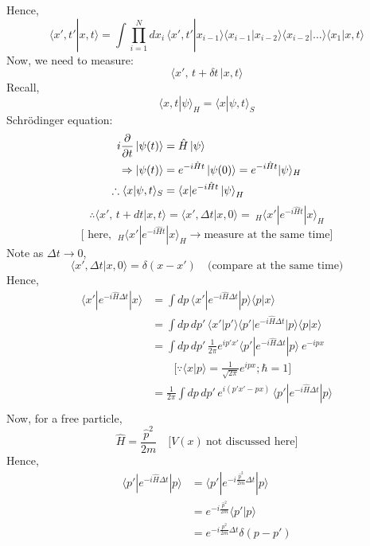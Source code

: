 \documentclass[14pt]{article} %
\begin{document}
\noindent
Hence,
\[
\langle x', t' | x, t \rangle = \int \prod_{i=1}^N dx_i \, \langle x', t' | x_{i-1} \rangle \langle x_{i-1}| x_{i-2} \rangle \langle x_{i-2}| \dots \rangle \langle x_1 | x, t \rangle
\]
Now, we need to measure:
\[
\langle x',\, t + \delta t \,| x, t \rangle
\]
Recall,
\[
\langle x, t | \psi \rangle_H = \langle x | \psi, t \rangle_S
\]
Schrödinger equation:
\begin{align*}
i \frac{\partial}{\partial t} \ket{\psi(t)} &= \hat{H} \ket{\psi} \\
\Rightarrow \ket{\psi(t)} &= e^{-i \hat{H} t}  \ket{\psi(0)} = e^{- i \hat{H}t } |\psi \rangle_H \\
\therefore  \langle x | \psi, t \rangle_S &= \langle x | e^{-i \hat{H} t} \ket{\psi}_H
\end{align*}
\[
\boxed{\therefore \langle x',\, t + dt | x, t \rangle 
= \langle x', \Delta t | x,0 \rangle =  ~_H\langle x' | e^{-i \hat{H} t} | x \rangle_H}
\]
\[
\big[ \text{ here, } ~_H\langle x' | e^{-i \hat{H} t} | x \rangle_H \to \text{measure at the same time} \big]
\]
Note as $\Delta t \to 0$,
\[
\langle x', \Delta t | x,0 \rangle = \delta(x - x') \quad \text{(compare at the same time)}
\]
Hence,
\begin{align*}
\langle x' | e^{-i \hat{H} \Delta t} | x \rangle &= \int dp \, \langle x' | e^{-i \hat{H} \Delta t} |p \rangle \langle p | x \rangle \\
&= \int dp \, dp' \, \langle x' | p' \rangle \langle p' | e^{-i \hat{H} \Delta t} | p \rangle \langle p | x \rangle \\
&= \int dp \, dp' \, \frac{1}{2\pi} e^{ip'x'} \langle p' | e^{-i \hat{H} \Delta t} | p \rangle ~e^{-ipx} \\
&\quad \quad \big[ \because \langle x|p \rangle = \frac{1}{\sqrt{2 \pi}} e^{ipx} ; \hbar=1 \big] \\
&= \frac{1}{2\pi}\int dp \, dp' \,  e^{i(p'x'-px)}\, \langle p' | e^{-i \hat{H} \Delta t} | p \rangle \\
\end{align*}
Now, for a free particle,
\[
\hat{H} = \frac{\hat{p}^2}{2m} \quad \big[ V(x) ~\text{not discussed here} \big]
\]
Hence,
\begin{align*}
\langle p' | e^{-i \hat{H} \Delta t} | p \rangle &= \langle p' | e^{-i \frac{\hat{p}^2}{2m} \Delta t} | p \rangle\\
&= e^{-i \frac{\hat{p}^2}{2m}} \langle p'|p \rangle \\
&= e^{-i \frac{p^2}{2m} \Delta t} \delta(p - p')
\end{align*}
\end{document}
